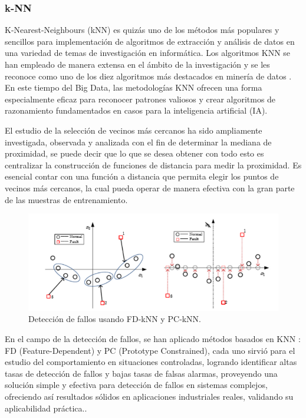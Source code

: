 \documentclass[11pt,a4paper,spanish]{book}
\numberwithin{equation}{chapter}
\numberwithin{figure}{chapter}
\begin{document}
\subsubsection{k-NN}


K-Nearest-Neighbours (kNN) es quizás uno de los métodos más populares y sencillos para implementación de algoritmos de extracción y análisis de datos en una variedad de temas de investigación en informática. Los algoritmos KNN se han empleado de manera extensa en el ámbito de la investigación y se les reconoce como uno de los diez algoritmos más destacados en minería de datos \cite{witten2005data}. En este tiempo del Big Data, las metodologías KNN ofrecen una forma especialmente eficaz para reconocer patrones valiosos y crear algoritmos de razonamiento fundamentados en casos para la inteligencia artificial (IA). \cite{wu2008top}


El estudio de la selección de vecinos más cercanos ha sido ampliamente investigada, observada y analizada con el fin de determinar la mediana de proximidad, se puede decir que lo que se desea obtener con todo esto es centralizar la construcción de funciones de distancia para medir la proximidad. Es esencial contar con una función a distancia que permita elegir los puntos de vecinos más cercanos, la cual pueda operar de manera efectiva con la gran parte de las muestras de entrenamiento. \cite{zhang2022influence}

\begin{figure}[h]
    \centering
    \includegraphics[width=1.0\textwidth]{media/knn-zhou.png}
    \caption{Detección de fallos usando FD‑kNN y PC‑kNN.  \protect\cite{zhou2015faultdetection} }
    \label{fig:figKnnZhou}
\end{figure}


En el campo de la detección de fallos, se han aplicado métodos basados en KNN : FD (Feature-Dependent) y PC (Prototype Constrained), cada uno sirvió para el estudio del comportamiento en situaciones controladas, logrando identificar altas tasas de detección de fallos y bajas tasas de falsas alarmas, proveyendo una solución simple y efectiva para detección de fallos en sistemas complejos, ofreciendo así resultados sólidos en aplicaciones industriales reales, validando su aplicabilidad práctica.\cite{zhou2015faultdetection}.
\end{document}
